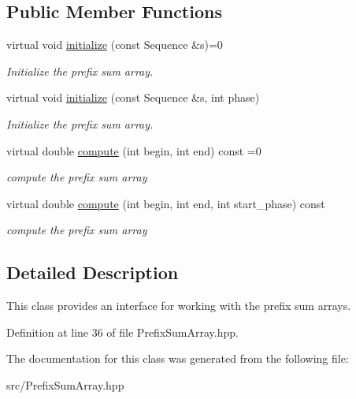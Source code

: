 \subsection*{Public Member Functions}
\begin{DoxyCompactItemize}
\item 
\mbox{\label{classtops_1_1PrefixSumArray_a0a2945dddd6283b419be2e66c4c55791}} 
virtual void \hyperlink{classtops_1_1PrefixSumArray_a0a2945dddd6283b419be2e66c4c55791}{initialize} (const Sequence \&s)=0
\begin{DoxyCompactList}\small\item\em Initialize the prefix sum array. \end{DoxyCompactList}\item 
\mbox{\label{classtops_1_1PrefixSumArray_a79116d4990f22b64773d804cf4503ecf}} 
virtual void \hyperlink{classtops_1_1PrefixSumArray_a79116d4990f22b64773d804cf4503ecf}{initialize} (const Sequence \&s, int phase)
\begin{DoxyCompactList}\small\item\em Initialize the prefix sum array. \end{DoxyCompactList}\item 
\mbox{\label{classtops_1_1PrefixSumArray_af7adb8a4306e2361912a60927abf2a35}} 
virtual double \hyperlink{classtops_1_1PrefixSumArray_af7adb8a4306e2361912a60927abf2a35}{compute} (int begin, int end) const =0
\begin{DoxyCompactList}\small\item\em compute the prefix sum array \end{DoxyCompactList}\item 
\mbox{\label{classtops_1_1PrefixSumArray_ad8b0a8d676b9f45eb2e68ea76a19081a}} 
virtual double \hyperlink{classtops_1_1PrefixSumArray_ad8b0a8d676b9f45eb2e68ea76a19081a}{compute} (int begin, int end, int start\+\_\+phase) const
\begin{DoxyCompactList}\small\item\em compute the prefix sum array \end{DoxyCompactList}\end{DoxyCompactItemize}


\subsection{Detailed Description}
This class provides an interface for working with the prefix sum arrays. 

Definition at line 36 of file Prefix\+Sum\+Array.\+hpp.



The documentation for this class was generated from the following file\+:\begin{DoxyCompactItemize}
\item 
src/Prefix\+Sum\+Array.\+hpp\end{DoxyCompactItemize}

